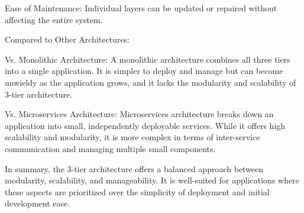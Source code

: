 Ease of Maintenance: Individual layers can be updated or repaired without affecting the entire system.

Compared to Other Architectures:

Vs. Monolithic Architecture: A monolithic architecture combines all three tiers into a single application. It is simpler to deploy and manage but can become unwieldy as the application grows, and it lacks the modularity and scalability of 3-tier architecture.

Vs. Microservices Architecture: Microservices architecture breaks down an application into small, independently deployable services. While it offers high scalability and modularity, it is more complex in terms of inter-service communication and managing multiple small components.

In summary, the 3-tier architecture offers a balanced approach between modularity, scalability, and manageability. It is well-suited for applications where these aspects are prioritized over the simplicity of deployment and initial development ease.

